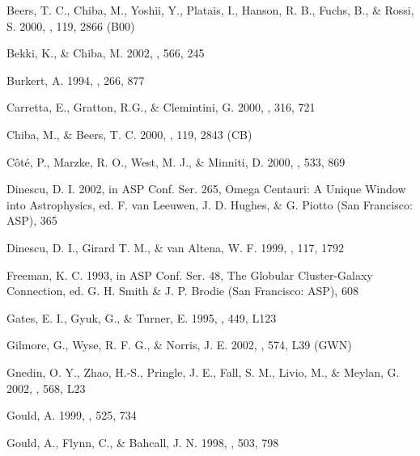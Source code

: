 \documentclass[preprint,12pt]{aastex}
\begin{document}
\clearpage
\begin{thebibliography}{}

 Beers, T. C., Chiba, M., Yoshii, Y., Platais, I.,
Hanson, R. B., Fuchs, B., \& Rossi, S. 2000, \aj, 119, 2866 (B00)

 Bekki, K., \& Chiba, M. 2002, \apj, 566, 245


 Burkert, A. 1994, \mnras, 266, 877


 Carretta, E., Gratton, R.G., \& Clemintini, G. 2000,
\mnras, 316, 721 

 Chiba, M., \& Beers, T. C. 2000, \aj, 119, 2843 (CB)

 C\^{o}t\'{e}, P., Marzke, R. O., West, M. J., \& Minniti, D.
2000, \apj, 533, 869

 Dinescu, D. I. 2002, in ASP Conf. Ser. 265, Omega Centauri: A
Unique Window into Astrophysics, ed. F. van Leeuwen, J. D. Hughes, \&
G. Piotto (San Francisco: ASP), 365

 Dinescu, D. I., Girard T. M., \& van Altena, W. F. 1999, \aj,
 117, 1792


 Freeman, K. C. 1993, in ASP Conf. Ser. 48, The Globular
Cluster-Galaxy Connection, ed. G. H. Smith \& J. P. Brodie
(San Francisco: ASP), 608


 Gates, E. I., Gyuk, G., \& Turner, E. 1995, \apj, 449, L123

 Gilmore, G., Wyse, R. F. G., \& Norris, J. E. 2002,
\apj, 574, L39 (GWN)

 Gnedin, O. Y., Zhao, H.-S., Pringle, J. E., Fall, S. M.,
Livio, M., \& Meylan, G. 2002, \apj, 568, L23

 Gould, A. 1999, \apj, 525, 734

 Gould, A., Flynn, C., \& Bahcall, J. N. 1998, \apj, 503, 798


\end{thebibliography}
\end{document}
